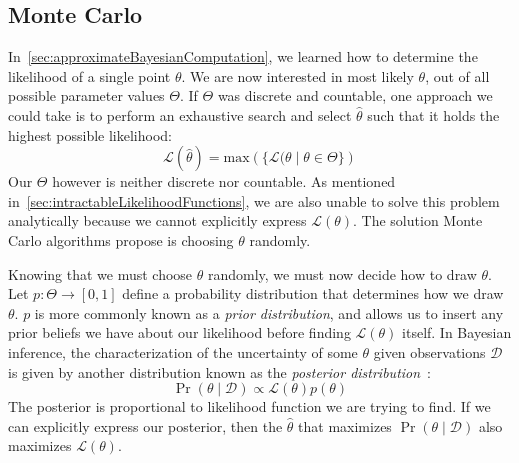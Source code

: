 \subsection{Monte Carlo}\label{subsec:monteCarlo}
In~\autoref{sec:approximateBayesianComputation}, we learned how to determine the likelihood of a single point $\theta$.
We are now interested in most likely $\theta$, out of all possible parameter values $\Theta$.
If $\Theta$ was discrete and countable, one approach we could take is to perform an exhaustive search and select
$\hat{\theta}$ such that it holds the highest possible likelihood:
\begin{equation}
    \mathcal{L}(\hat{\theta}) = \text{max}\left( \{ \mathcal{L}(\theta \mid \theta \in \Theta \} \right)
\end{equation}
Our $\Theta$ however is neither discrete nor countable.
As mentioned in~\autoref{sec:intractableLikelihoodFunctions}, we are also unable to solve this problem analytically
because we cannot explicitly express $\mathcal{L}(\theta)$.
The solution Monte Carlo algorithms propose is choosing $\theta$ randomly.

Knowing that we must choose $\theta$ randomly, we must now decide how to draw $\theta$.
Let $p : \Theta \rightarrow [0, 1]$ define a probability distribution that determines how we draw $\theta$.
$p$ is more commonly known as a \emph{prior distribution}, and allows us to insert any prior beliefs we have about our
likelihood before finding $\mathcal{L}(\theta)$ itself.
In Bayesian inference, the characterization of the uncertainty of some $\theta$ given observations $\mathcal{D}$ is
given by another distribution known as the
\emph{posterior distribution}~\cite{lintusaariFundamentalsRecentDevelopments2017}:
\begin{equation}
    \Pr(\theta \mid \mathcal{D}) \propto \mathcal{L}(\theta) p(\theta)
\end{equation}
The posterior is proportional to likelihood function we are trying to find.
If we can explicitly express our posterior, then the $\hat{\theta}$ that maximizes $\Pr(\theta \mid \mathcal{D})$ also
maximizes $\mathcal{L}(\theta)$.

